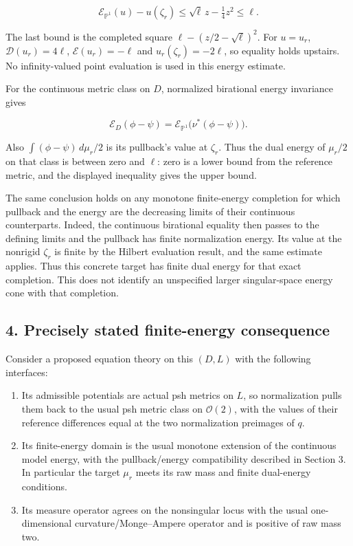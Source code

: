 \documentclass[
  11pt,
]{article}
\providecommand{\tightlist}{%
  \setlength{\itemsep}{0pt}\setlength{\parskip}{0pt}}
\begin{document}
\[
\mathcal E_{\mathbb P^1}(u)-u(\zeta_r)
\leq\sqrt\ell\,z-\tfrac14z^2\leq\ell.
\]

The last bound is the completed square \(\ell-(z/2-\sqrt\ell)^2\). For
\(u=u_r\), \(\mathcal D(u_r)=4\ell\), \(\mathcal E(u_r)=-\ell\) and
\(u_r(\zeta_r)=-2\ell\), so equality holds upstairs. No infinity-valued
point evaluation is used in this energy estimate.

For the continuous metric class on \(D\), normalized birational energy
invariance gives

\[
\mathcal E_D(\phi-\psi)=
\mathcal E_{\mathbb P^1}\bigl(\nu^*(\phi-\psi)\bigr).
\]

Also \(\int(\phi-\psi)\,d\mu_r/2\) is its pullback's value at
\(\zeta_r\). Thus the dual energy of \(\mu_r/2\) on that class is
between zero and \(\ell\): zero is a lower bound from the reference
metric, and the displayed inequality gives the upper bound.

The same conclusion holds on any monotone finite-energy completion for
which pullback and the energy are the decreasing limits of their
continuous counterparts. Indeed, the continuous birational equality then
passes to the defining limits and the pullback has finite normalization
energy. Its value at the nonrigid \(\zeta_r\) is finite by the Hilbert
evaluation result, and the same estimate applies. Thus this concrete
target has finite dual energy for that exact completion. This does not
identify an unspecified larger singular-space energy cone with that
completion.

\subsection{4. Precisely stated finite-energy
consequence}\label{precisely-stated-finite-energy-consequence}

Consider a proposed equation theory on this \((D,L)\) with the following
interfaces:

\begin{enumerate}
\def\labelenumi{\arabic{enumi}.}
\tightlist
\item
  Its admissible potentials are actual psh metrics on \(L\), so
  normalization pulls them back to the usual psh metric class on
  \(\mathcal O(2)\), with the values of their reference differences
  equal at the two normalization preimages of \(q\).
\item
  Its finite-energy domain is the usual monotone extension of the
  continuous model energy, with the pullback/energy compatibility
  described in Section 3. In particular the target \(\mu_r\) meets its
  raw mass and finite dual-energy conditions.
\item
  Its measure operator agrees on the nonsingular locus with the usual
  one-dimensional curvature/Monge--Ampere operator and is positive of
  raw mass two.
\end{enumerate}
\end{document}
